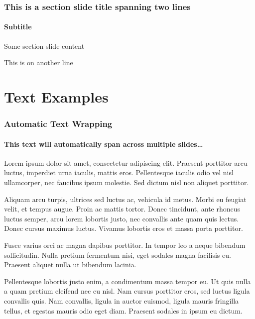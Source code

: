 \documentclass[
	aspectratio=169, %
	12pt, %
	t, %
]{beamer}
\begin{document}

\begin{sectionframe} %
	\frametitle{This is a section slide title spanning two lines}
	\framesubtitle{Subtitle}

	Some section slide content

	This is on another line
\end{sectionframe}


\section{Text Examples}


\begin{frame}[allowframebreaks] %
	\frametitle{Automatic Text Wrapping}
	\framesubtitle{This text will automatically span across multiple slides\ldots}
	
	Lorem ipsum dolor sit amet, consectetur adipiscing elit. Praesent porttitor arcu luctus, imperdiet urna iaculis, mattis eros. Pellentesque iaculis odio vel nisl ullamcorper, nec faucibus ipsum molestie. Sed dictum nisl non aliquet porttitor.
	
	\bigskip
	
	Aliquam arcu turpis, ultrices sed luctus ac, vehicula id metus. Morbi eu feugiat velit, et tempus augue. Proin ac mattis tortor. Donec tincidunt, ante rhoncus luctus semper, arcu lorem lobortis justo, nec convallis ante quam quis lectus. Donec cursus maximus luctus. Vivamus lobortis eros et massa porta porttitor.

	\bigskip

	Fusce varius orci ac magna dapibus porttitor. In tempor leo a neque bibendum sollicitudin. Nulla pretium fermentum nisi, eget sodales magna facilisis eu. Praesent aliquet nulla ut bibendum lacinia.

	\bigskip

	Pellentesque lobortis justo enim, a condimentum massa tempor eu. Ut quis nulla a quam pretium eleifend nec eu nisl. Nam cursus porttitor eros, sed luctus ligula convallis quis. Nam convallis, ligula in auctor euismod, ligula mauris fringilla tellus, et egestas mauris odio eget diam. Praesent sodales in ipsum eu dictum.
\end{frame}
\end{document}
